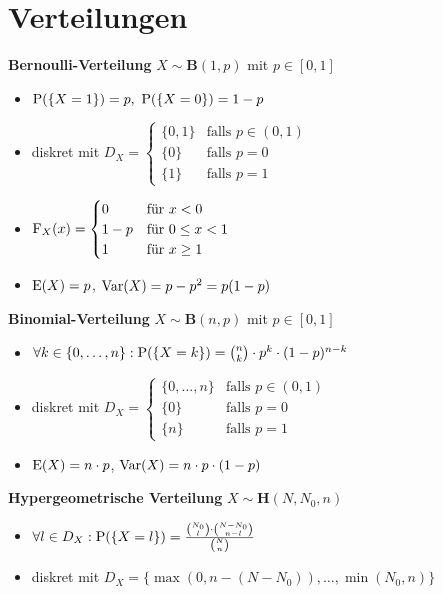 \section{Verteilungen}

\textbf{Bernoulli-Verteilung} $X\sim\mathbf{B}(1,p)$ mit $p\in [0,1]$
\begin{itemize}
\item $\P(\{X=1\})=p,\ \P(\{X=0\})=1-p$

\item diskret mit $D_X=\begin{cases}
\{0,1\} 	& \text{falls } p\in (0,1)	\\
\{0\}	& \text{falls } p=0			\\
\{1\} 	& \text{falls } p=1
\end{cases}$

\item $\F_X(x)=\begin{cases}
0 	& \text{für } x<0				\\
1-p	& \text{für } 0\leq x <1			\\
1 	& \text{für } x\geq 1
\end{cases}$

\item $\E(X)=p$, $\Var(X)=p-p^2=p(1-p)$

\end{itemize}

\textbf{Binomial-Verteilung} $X\sim\mathbf{B}(n,p)$ mit $p\in [0,1]$
\begin{itemize}
\item $\forall k\in\{0,\ldots,n\}:\P(\{X=k\})=\binom{n}{k}\cdot p^k\cdot (1-p)^{n-k}$

\item diskret mit
$D_X=\begin{cases}
\{0,\ldots,n\} 	& \text{falls } p\in (0,1)	\\
\{0\}			& \text{falls } p=0			\\
\{n\} 			& \text{falls } p=1
\end{cases}$

\item $\E(X)=n\cdot p$, $\Var(X)=n\cdot p\cdot (1-p)$
\end{itemize}

\textbf{Hypergeometrische Verteilung} $X\sim\mathbf{H}(N,N_0,n)$
\begin{itemize}
\item $\forall l\in D_X:\P(\{X=l\})
=\frac{\binom{N_0}{l}\cdot\binom{N-N_0}{n-l}}{\binom{N}{n}}$

\item diskret mit 
$D_X=\{\operatorname{max}(0,n-(N-N_0)),\ldots,\operatorname{min}(N_0,n)\}$
\end{itemize}

